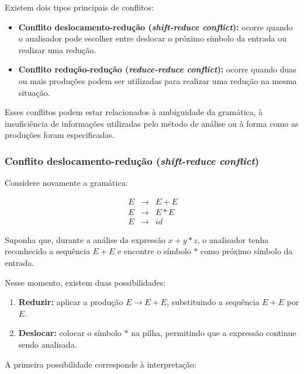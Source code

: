 \documentclass[
  brazilian,
  letterpaper,
]{book}
\providecommand{\tightlist}{%
  \setlength{\itemsep}{0pt}\setlength{\parskip}{0pt}}
\theoremstyle{plain}
\theoremstyle{definition}
\theoremstyle{remark}
\begin{document}
Existem dois tipos principais de conflitos:

\begin{itemize}
\tightlist
\item
  \textbf{Conflito deslocamento-redução (\emph{shift-reduce conflict}):}
  ocorre quando o analisador pode escolher entre deslocar o próximo
  símbolo da entrada ou realizar uma redução.
\item
  \textbf{Conflito redução-redução (\emph{reduce-reduce conflict}):}
  ocorre quando duas ou mais produções podem ser utilizadas para
  realizar uma redução na mesma situação.
\end{itemize}

Esses conflitos podem estar relacionados à ambiguidade da gramática, à
insuficiência de informações utilizadas pelo método de análise ou à
forma como as produções foram especificadas.

\subsubsection{\texorpdfstring{Conflito deslocamento-redução
(\emph{shift-reduce
conflict})}{Conflito deslocamento-redução (shift-reduce conflict)}}\label{conflito-deslocamento-reduuxe7uxe3o-shift-reduce-conflict}

Considere novamente a gramática:

\[
\begin{array}{rcl}\
E &\rightarrow& E+E\\\
E &\rightarrow& E*E\\\
E &\rightarrow& id\
\end{array}
\]

Suponha que, durante a análise da expressão \(x+y*z\), o analisador
tenha reconhecido a sequência \(E+E\) e encontre o símbolo \(*\) como
próximo símbolo da entrada.

Nesse momento, existem duas possibilidades:

\begin{enumerate}
\def\labelenumi{\arabic{enumi}.}
\tightlist
\item
  \textbf{Reduzir:} aplicar a produção \(E\rightarrow E+E\),
  substituindo a sequência \(E+E\) por \(E\).
\item
  \textbf{Deslocar:} colocar o símbolo \(*\) na pilha, permitindo que a
  expressão continue sendo analisada.
\end{enumerate}

A primeira possibilidade corresponde à interpretação:
\end{document}
